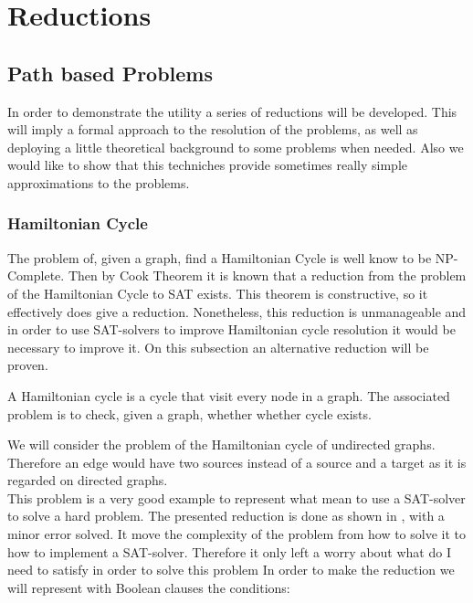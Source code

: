 \part{Reductions} %
\label{chap:3}


\chapter{Path based Problems}
In order to demonstrate the utility a series of reductions will be developed. This will imply a formal approach to the resolution of the problems, as well as deploying a little theoretical background to some problems when needed. Also we would like to show that this techniches provide sometimes really simple approximations to the problems.

\section{Hamiltonian Cycle}


The problem of, given a graph, find a Hamiltonian Cycle is well know to be NP-Complete. Then by Cook Theorem it is known that a reduction from the problem of the Hamiltonian Cycle to SAT exists. This theorem is constructive, so it effectively does give a reduction. Nonetheless, this reduction is unmanageable and in order to use SAT-solvers to improve Hamiltonian cycle resolution it would be necessary to improve it. On this subsection an alternative reduction will be proven.

\begin{definition}
  A Hamiltonian cycle is a cycle that visit every node in a graph. The associated problem is to check, given a graph, whether whether cycle exists.
\end{definition}

We will consider the problem of the Hamiltonian cycle of undirected graphs. Therefore an edge would have two sources instead of a source and a target as it is regarded on directed graphs.\\

This problem is a very good example to represent what mean to use a SAT-solver to solve a hard problem. The presented reduction is done as shown in \cite{49593}, with a minor error solved. It move the complexity of the problem from how to solve it to how to implement a SAT-solver. Therefore it only left a worry about what do I need to satisfy in order to solve this problem In order to make the reduction we will represent with Boolean clauses the conditions:\\


